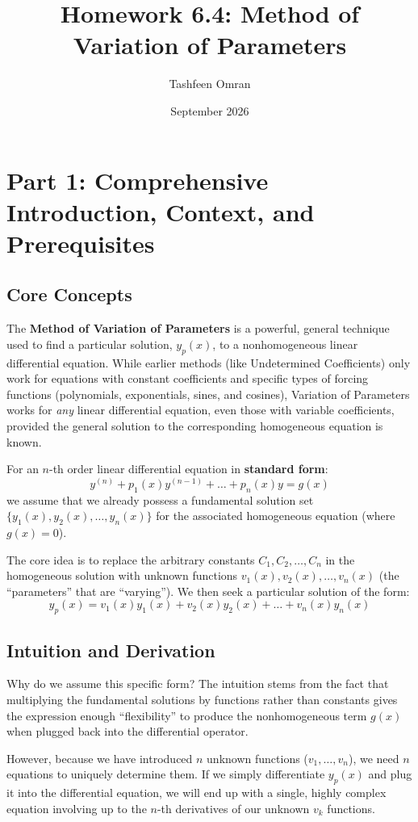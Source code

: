 \documentclass[12pt]{article}
\title{\textbf{Homework 6.4: Method of Variation of Parameters}}
\author{Tashfeen Omran}
\date{September 2026}
\begin{document}
\maketitle
\tableofcontents
\newpage

\section{Part 1: Comprehensive Introduction, Context, and Prerequisites}

\subsection{Core Concepts}
The \textbf{Method of Variation of Parameters} is a powerful, general technique used to find a particular solution, $y_p(x)$, to a nonhomogeneous linear differential equation. While earlier methods (like Undetermined Coefficients) only work for equations with constant coefficients and specific types of forcing functions (polynomials, exponentials, sines, and cosines), Variation of Parameters works for \textit{any} linear differential equation, even those with variable coefficients, provided the general solution to the corresponding homogeneous equation is known.

For an $n$-th order linear differential equation in \textbf{standard form}:
\[ y^{(n)} + p_1(x)y^{(n-1)} + \dots + p_n(x)y = g(x) \]
we assume that we already possess a fundamental solution set $\{y_1(x), y_2(x), \dots, y_n(x)\}$ for the associated homogeneous equation (where $g(x) = 0$). 

The core idea is to replace the arbitrary constants $C_1, C_2, \dots, C_n$ in the homogeneous solution with unknown functions $v_1(x), v_2(x), \dots, v_n(x)$ (the ``parameters'' that are ``varying''). We then seek a particular solution of the form:
\[ y_p(x) = v_1(x)y_1(x) + v_2(x)y_2(x) + \dots + v_n(x)y_n(x) \]

\subsection{Intuition and Derivation}
Why do we assume this specific form? The intuition stems from the fact that multiplying the fundamental solutions by functions rather than constants gives the expression enough ``flexibility'' to produce the nonhomogeneous term $g(x)$ when plugged back into the differential operator. 

However, because we have introduced $n$ unknown functions ($v_1, \dots, v_n$), we need $n$ equations to uniquely determine them. If we simply differentiate $y_p(x)$ and plug it into the differential equation, we will end up with a single, highly complex equation involving up to the $n$-th derivatives of our unknown $v_k$ functions. 
\end{document}
